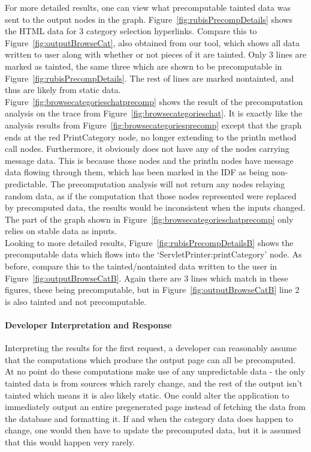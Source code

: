 \documentclass[msc,oneside]{ubcthesis}
\begin{document}
For more detailed results, one can view what precomputable tainted data was sent to the output nodes in the graph. Figure~\ref{fig:rubisPrecompDetails} shows the HTML data for 3 category selection hyperlinks. Compare this to Figure~\ref{fig:outputBrowseCat}, also obtained from our tool, which shows all data written to user along with whether or not pieces of it are tainted. Only 3 lines are marked as tainted, the same three which are shown to be precomputable in Figure~\ref{fig:rubisPrecompDetails}. The rest of lines are marked nontainted, and thus are likely from static data. \\

Figure~\ref{fig:browsecategorieschatprecomp} shows the result of the precomputation analysis on the trace from Figure~\ref{fig:browsecategorieschat}. It is exactly like the analysis results from Figure~\ref{fig:browsecategoriesprecomp} except that the graph ends at the red PrintCategory node, no longer extending to the println method call nodes. Furthermore, it obviously does not have any of the nodes carrying message data. This is because those nodes and the println nodes have message data flowing through them, which has been marked in the IDF as being non-predictable. The precomputation analysis will not return any nodes relaying random data, as if the computation that those nodes represented were replaced by precomputed data, the results would be inconsistent when the inputs changed. The part of the graph shown in Figure~\ref{fig:browsecategorieschatprecomp} only relies on stable data as inputs.\\

Looking to more detailed results, Figure~\ref{fig:rubisPrecompDetailsB} shows the precomputable data which flows into the `ServletPrinter:printCategory' node. As before, compare this to the tainted/nontainted data written to the user in Figure~\ref{fig:outputBrowseCatB}. Again there are 3 lines which match in these figures, these being precomputable, but in Figure~\ref{fig:outputBrowseCatB} line 2 is also tainted and not precomputable.

\paragraph{Developer Interpretation and Response}

Interpreting the results for the first request, a developer can reasonably assume that the computations which produce the output page can all be precomputed. At no point do these computations make use of any unpredictable data - the only tainted data is from sources which rarely change, and the rest of the output isn't tainted which means it is also likely static. One could alter the application to immediately output an entire pregenerated page instead of fetching the data from the database and formatting it. If and when the category data does happen to change, one would then have to update the precomputed data, but it is assumed that this would happen very rarely.\\
\end{document}
